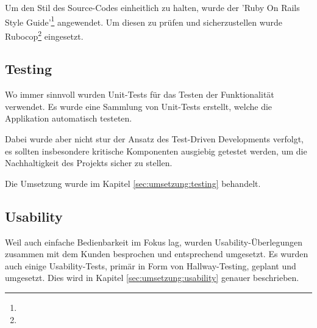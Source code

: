Um den Stil des Source-Codes einheitlich zu halten, wurde der 'Ruby On Rails Style Guide'\footnote{} angewendet. Um diesen zu prüfen und sicherzustellen wurde Rubocop\footnote{} eingesetzt.

\subsection*{Testing}

Wo immer sinnvoll wurden Unit-Tests für das Testen der Funktionalität verwendet. Es wurde eine Sammlung von Unit-Tests erstellt, welche die Applikation automatisch testeten.

Dabei wurde aber nicht stur der Ansatz des Test-Driven Developments verfolgt, es sollten insbesondere kritische Komponenten ausgiebig getestet werden, um die Nachhaltigkeit des Projekts sicher zu stellen.

Die Umsetzung wurde im Kapitel \ref{sec:umsetzung:testing} behandelt.

\subsection*{Usability}

Weil auch einfache Bedienbarkeit im Fokus lag, wurden Usability-Überlegungen zusammen mit dem Kunden besprochen und entsprechend umgesetzt. Es wurden auch einige Usability-Tests, primär in Form von Hallway-Testing, geplant und umgesetzt. Dies wird in Kapitel \ref{sec:umsetzung:usability} genauer beschrieben.
